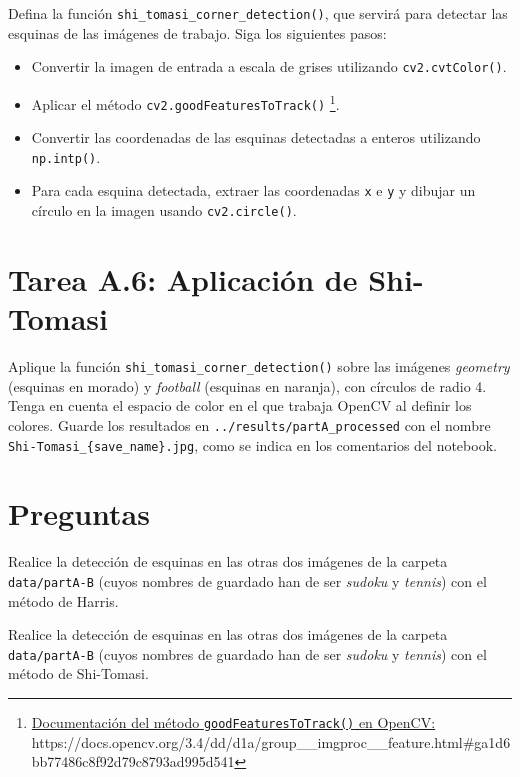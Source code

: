 Defina la función \texttt{shi\_tomasi\_corner\_detection()}, que servirá para detectar las esquinas de las imágenes de trabajo. Siga los siguientes pasos:

\begin{itemize}
    \item Convertir la imagen de entrada a escala de grises utilizando \texttt{cv2.cvtColor()}.
    \item Aplicar el método \texttt{cv2.goodFeaturesToTrack()} \footnote{ \href{https://docs.opencv.org/3.4/dd/d1a/group\_\_imgproc\_\_feature.html\#ga1d6bb77486c8f92d79c8793ad995d541}{Documentación del método \texttt{goodFeaturesToTrack()} en OpenCV:} \\{https://docs.opencv.org/3.4/dd/d1a/group\_\_imgproc\_\_feature.html\#ga1d6bb77486c8f92d79c8793ad995d541}}.
    \item Convertir las coordenadas de las esquinas detectadas a enteros utilizando \texttt{np.intp()}.
    \item Para cada esquina detectada, extraer las coordenadas \texttt{x} e \texttt{y} y dibujar un círculo en la imagen usando \texttt{cv2.circle()}.
\end{itemize}

\section*{Tarea A.6: Aplicación de Shi-Tomasi}
{}

Aplique la función \texttt{shi\_tomasi\_corner\_detection()} sobre las imágenes \textit{geometry} (esquinas en morado) y \textit{football} (esquinas en naranja), con círculos de radio 4. Tenga en cuenta el espacio de color en el que trabaja OpenCV al definir los colores. Guarde los resultados en \texttt{../results/partA\_processed} con el nombre \texttt{Shi-Tomasi\_\{save\_name\}.jpg}, como se indica en los comentarios del notebook.

\section*{Preguntas}

\vspace{5mm}
\begin{tcolorbox}[colback=gray!10, colframe=gray!30, coltitle=black, title=Pregunta A.1, halign=left]
Realice la detección de esquinas en las otras dos imágenes de la carpeta \texttt{data/partA-B} (cuyos nombres de guardado han de ser \textit{sudoku} y \textit{tennis}) con el método de Harris.
\end{tcolorbox}

\vspace{5mm}
\begin{tcolorbox}[colback=gray!10, colframe=gray!30, coltitle=black, title=Pregunta A.2, halign=left]
Realice la detección de esquinas en las otras dos imágenes de la carpeta \texttt{data/partA-B} (cuyos nombres de guardado han de ser \textit{sudoku} y \textit{tennis}) con el método de Shi-Tomasi.
\end{tcolorbox}
